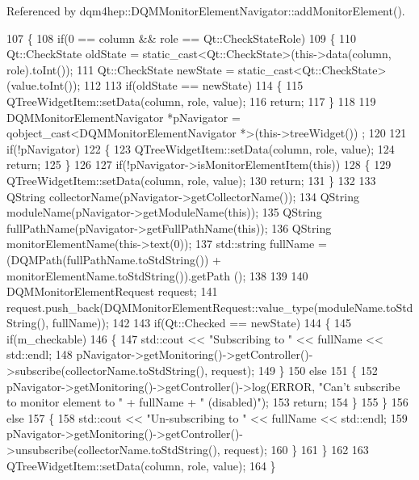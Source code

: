 Referenced by dqm4hep\+::\+D\+Q\+M\+Monitor\+Element\+Navigator\+::add\+Monitor\+Element().


\begin{DoxyCode}
107 \{
108   \textcolor{keywordflow}{if}(0 == column && role == Qt::CheckStateRole)
109   \{
110     Qt::CheckState oldState = \textcolor{keyword}{static\_cast<}Qt::CheckState\textcolor{keyword}{>}(this->data(column, role).toInt());
111     Qt::CheckState newState = \textcolor{keyword}{static\_cast<}Qt::CheckState\textcolor{keyword}{>}(value.toInt());
112 
113     \textcolor{keywordflow}{if}(oldState == newState)
114     \{
115       QTreeWidgetItem::setData(column, role, value);
116       \textcolor{keywordflow}{return};
117     \}
118 
119     DQMMonitorElementNavigator *pNavigator = qobject\_cast<DQMMonitorElementNavigator *>(this->treeWidget())
      ;
120 
121     \textcolor{keywordflow}{if}(!pNavigator)
122     \{
123       QTreeWidgetItem::setData(column, role, value);
124       \textcolor{keywordflow}{return};
125     \}
126 
127     \textcolor{keywordflow}{if}(!pNavigator->isMonitorElementItem(\textcolor{keyword}{this}))
128     \{
129       QTreeWidgetItem::setData(column, role, value);
130       \textcolor{keywordflow}{return};
131     \}
132 
133     QString collectorName(pNavigator->getCollectorName());
134     QString moduleName(pNavigator->getModuleName(\textcolor{keyword}{this}));
135     QString fullPathName(pNavigator->getFullPathName(\textcolor{keyword}{this}));
136     QString monitorElementName(this->text(0));
137     std::string fullName = (DQMPath(fullPathName.toStdString()) + monitorElementName.toStdString()).getPath
      ();
138 
139 
140     DQMMonitorElementRequest request;
141     request.push\_back(DQMMonitorElementRequest::value\_type(moduleName.toStdString(), fullName));
142 
143     \textcolor{keywordflow}{if}(Qt::Checked == newState)
144     \{
145       \textcolor{keywordflow}{if}(m_checkable)
146       \{
147         std::cout << \textcolor{stringliteral}{"Subscribing to "} << fullName << std::endl;
148         pNavigator->getMonitoring()->getController()->subscribe(collectorName.toStdString(), request);
149       \}
150       \textcolor{keywordflow}{else}
151       \{
152         pNavigator->getMonitoring()->getController()->log(ERROR, \textcolor{stringliteral}{"Can't subscribe to monitor element to "} +
       fullName + \textcolor{stringliteral}{" (disabled)"});
153         \textcolor{keywordflow}{return};
154       \}
155     \}
156     \textcolor{keywordflow}{else}
157     \{
158       std::cout << \textcolor{stringliteral}{"Un-subscribing to "} << fullName << std::endl;
159       pNavigator->getMonitoring()->getController()->unsubscribe(collectorName.toStdString(), request);
160     \}
161   \}
162 
163   QTreeWidgetItem::setData(column, role, value);
164 \}
\end{DoxyCode}


